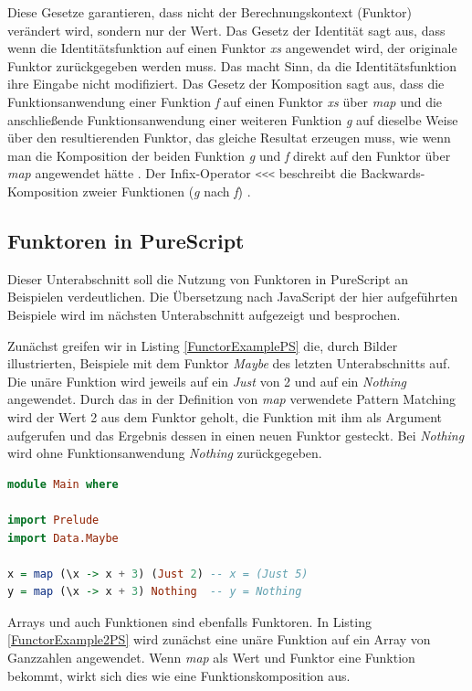 \documentclass[
12pt,
ngerman,
oneside]
{scrbook} %
\begin{document}
Diese Gesetze garantieren, dass nicht der Berechnungskontext (Funktor) verändert wird, sondern nur der Wert. Das Gesetz der Identität sagt aus, dass wenn die Identitätsfunktion auf einen Funktor \emph{xs} angewendet wird, der originale Funktor zurückgegeben werden muss. Das macht Sinn, da die Identitätsfunktion ihre Eingabe nicht modifiziert. Das Gesetz der Komposition sagt aus, dass die Funktionsanwendung einer Funktion \emph{f} auf einen Funktor \emph{xs} über \emph{map} und die anschließende Funktionsanwendung einer weiteren Funktion \emph{g} auf dieselbe Weise über den resultierenden Funktor, das gleiche Resultat erzeugen muss, wie wenn man die Komposition der beiden Funktion \emph{g} und \emph{f} direkt auf den Funktor über \emph{map} angewendet hätte \cite[][S. 69]{AdityaBhargava13}. Der Infix-Operator \lstinline[language=purescript, columns=fixed]{<<<} beschreibt die Backwards-Komposition zweier Funktionen (\emph{g} nach \emph{f}) \cite[][S. 28]{Freeman17}.

\subsection{Funktoren in PureScript}
Dieser Unterabschnitt soll die Nutzung von Funktoren in PureScript an Beispielen verdeutlichen. Die Übersetzung nach JavaScript der hier aufgeführten Beispiele wird im nächsten Unterabschnitt aufgezeigt und besprochen.

Zunächst greifen wir  in Listing \ref{FunctorExamplePS} die, durch Bilder illustrierten, Beispiele mit dem Funktor \emph{Maybe} des letzten Unterabschnitts auf. Die unäre Funktion wird jeweils auf ein \emph{Just} von 2 und auf ein \emph{Nothing} angewendet. Durch das in der Definition von \emph{map} verwendete Pattern Matching wird der Wert 2 aus dem Funktor geholt, die Funktion mit ihm als Argument aufgerufen und das Ergebnis dessen in einen neuen Funktor gesteckt. Bei \emph{Nothing} wird ohne Funktionsanwendung \emph{Nothing} zurückgegeben.

\begin{lstlisting}[language=purescript, style=numbered-and-boxed, caption=Beispiel mit Funktoren in PS, label=FunctorExamplePS]
module Main where

import Prelude
import Data.Maybe

x = map (\x -> x + 3) (Just 2) -- x = (Just 5)
y = map (\x -> x + 3) Nothing  -- y = Nothing
\end{lstlisting}

Arrays und auch Funktionen sind ebenfalls Funktoren. In Listing \ref{FunctorExample2PS} wird zunächst eine unäre Funktion auf ein Array von Ganzzahlen angewendet. Wenn \emph{map} als Wert und Funktor eine Funktion bekommt, wirkt sich dies wie eine Funktionskomposition aus.
\end{document}
